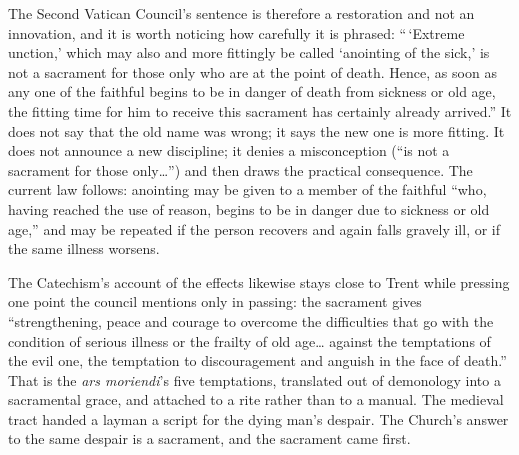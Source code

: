 The Second Vatican Council's sentence is therefore a restoration and not an innovation, and it is worth noticing how carefully it is phrased: ``\,`Extreme unction,' which may also and more fittingly be called `anointing of the sick,' is not a sacrament for those only who are at the point of death. Hence, as soon as any one of the faithful begins to be in danger of death from sickness or old age, the fitting time for him to receive this sacrament has certainly already arrived.'' It does not say that the old name was wrong; it says the new one is more fitting. It does not announce a new discipline; it denies a misconception (``is not a sacrament for those only\ldots'') and then draws the practical consequence. The current law follows: anointing may be given to a member of the faithful ``who, having reached the use of reason, begins to be in danger due to sickness or old age,'' and may be repeated if the person recovers and again falls gravely ill, or if the same illness worsens.

The Catechism's account of the effects likewise stays close to Trent while pressing one point the council mentions only in passing: the sacrament gives ``strengthening, peace and courage to overcome the difficulties that go with the condition of serious illness or the frailty of old age\ldots{} against the temptations of the evil one, the temptation to discouragement and anguish in the face of death.'' That is the \emph{ars moriendi}'s five temptations, translated out of demonology into a sacramental grace, and attached to a rite rather than to a manual. The medieval tract handed a layman a script for the dying man's despair. The Church's answer to the same despair is a sacrament, and the sacrament came first.

